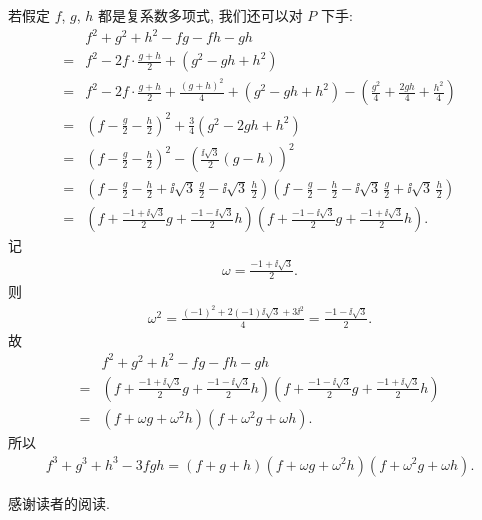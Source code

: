 \begin{example}
    若假定 $f$, $g$, $h$ 都是复系数多项式, 我们还可以对 $P$ 下手:
    \begin{align*}
             & f^2 + g^2 + h^2 - fg - fh - gh                                                                                                                                                                                \\
        = {} & f^2 - 2f \cdot \frac{g+h}{2} + (g^2 - gh + h^2)                                                                                                                                                               \\
        = {} & f^2 - 2f \cdot \frac{g+h}{2} + \frac{(g+h)^2}{4} + (g^2 - gh + h^2) - \left( \frac{g^2}{4} + \frac{2gh}{4} + \frac{h^2}{4} \right)                                                                            \\
        = {} & \left( f - \frac{g}{2} - \frac{h}{2} \right)^2 + \frac{3}{4} (g^2 - 2gh + h^2)                                                                                                                                \\
        = {} & \left( f - \frac{g}{2} - \frac{h}{2} \right)^2 - \left( \frac{\ii \sqrt{3}}{2} (g - h) \right)^2                                                                                                              \\
        = {} & \left( f - \frac{g}{2} - \frac{h}{2} + \ii \sqrt{3}\, \frac{g}{2} - \ii \sqrt{3}\, \frac{h}{2} \right) \left( f - \frac{g}{2} - \frac{h}{2} - \ii \sqrt{3}\, \frac{g}{2} + \ii \sqrt{3}\, \frac{h}{2} \right) \\
        = {} & \left( f + \frac{-1 + \ii \sqrt{3}}{2} g + \frac{-1 - \ii \sqrt{3}}{2} h \right) \left( f + \frac{-1 - \ii \sqrt{3}}{2} g + \frac{-1 + \ii \sqrt{3}}{2} h \right).
    \end{align*}
    记
    \begin{align*}
        \omega = \frac{-1 + \ii \sqrt{3}}{2}.
    \end{align*}
    则
    \begin{align*}
        \omega^2 = \frac{(-1)^2 + 2(-1) \ii \sqrt{3} + 3\ii^2}{4} = \frac{-1 - \ii \sqrt{3}}{2}.
    \end{align*}
    故
    \begin{align*}
             & f^2 + g^2 + h^2 - fg - fh - gh                                                                                                                                    \\
        = {} & \left( f + \frac{-1 + \ii \sqrt{3}}{2} g + \frac{-1 - \ii \sqrt{3}}{2} h \right) \left( f + \frac{-1 - \ii \sqrt{3}}{2} g + \frac{-1 + \ii \sqrt{3}}{2} h \right) \\
        = {} & (f + \omega g + \omega^2 h) (f + \omega^2 g + \omega h).
    \end{align*}
    所以
    \begin{align*}
        f^3 + g^3 + h^3 - 3fgh = (f + g + h) (f + \omega g + \omega^2 h) (f + \omega^2 g + \omega h).
    \end{align*}
\end{example}

感谢读者的阅读.
